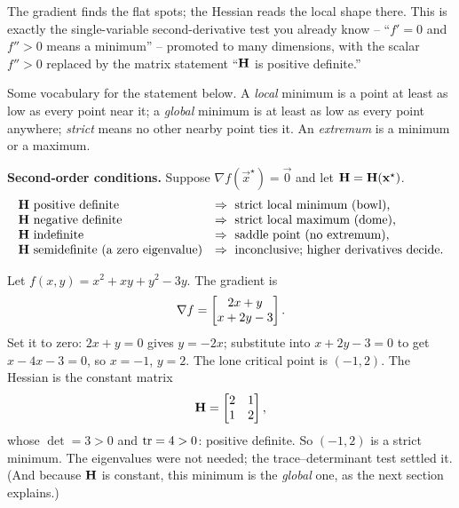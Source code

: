 \begin{intuitionbox}
The gradient finds the flat spots; the Hessian reads the local shape there. This is
exactly the single-variable second-derivative test you already know -- ``$f'=0$ and
$f''>0$ means a minimum'' -- promoted to many dimensions, with the scalar $f''>0$
replaced by the matrix statement ``$\mathbf{H}$ is positive definite.''
\end{intuitionbox}

Some vocabulary for the statement below. A \emph{local} minimum is a point at least as
low as every point near it; a \emph{global} minimum is at least as low as every point
anywhere; \emph{strict} means no other nearby point ties it. An \emph{extremum} is a
minimum or a maximum.

\begin{formalbox}
\label{ch36:thm-second-order}
\textbf{Second-order conditions.} Suppose $\nabla f(\vec{x}^\star)=\vec{0}$ and let $\mathbf{H}=\mathbf{H}(\mathbf{x}^\star)$.
\[
\begin{array}{ll}
\mat{H} \text{ positive definite} & \Rightarrow\ \text{strict local minimum (bowl),}\\
\mat{H} \text{ negative definite} & \Rightarrow\ \text{strict local maximum (dome),}\\
\mat{H} \text{ indefinite} & \Rightarrow\ \text{saddle point (no extremum),}\\
\mat{H} \text{ semidefinite (a zero eigenvalue)} & \Rightarrow\ \text{inconclusive; higher derivatives decide.}
\end{array}
\]
\end{formalbox}

\begin{example}
\label{ch36:ex-critical}
Let $f(x,y) = x^2 + xy + y^2 - 3y$. The gradient is
\[
  \nabla f = \begin{bmatrix}2x + y \\ x + 2y - 3\end{bmatrix}.
\]
Set it to zero: $2x+y=0$ gives $y=-2x$; substitute into $x+2y-3=0$ to get
$x-4x-3=0$, so $x=-1$, $y=2$. The lone critical point is $(-1,2)$. The Hessian is the
constant matrix
\[
  \mathbf{H} = \begin{bmatrix} 2 & 1 \\ 1 & 2 \end{bmatrix},
\]
whose $\det=3>0$ and $\operatorname{tr}=4>0$: positive definite. So $(-1,2)$ is a strict minimum.
The eigenvalues were not needed; the trace--determinant test settled it. (And
because $\mathbf{H}$ is constant, this minimum is the \emph{global} one, as the next
section explains.)
\end{example}

